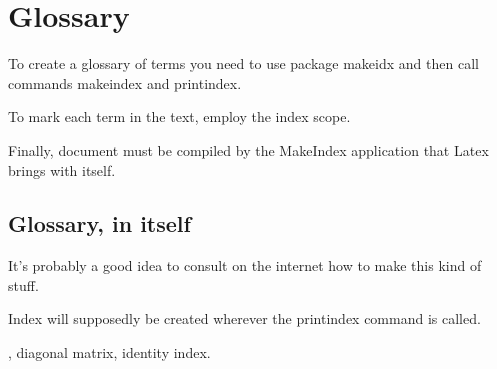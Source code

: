 \chapter{Glossary}

To create a glossary of terms you need to use package makeidx and then call commands makeindex and printindex.

To mark each term in the text, employ the index scope.

Finally, document must be compiled by the MakeIndex application that Latex brings with itself.


\section{Glossary, in itself}

It's probably a good idea to consult on the internet how to make this kind of stuff.

Index will supposedly be created wherever the printindex command is called.

, diagonal matrix, identity index.